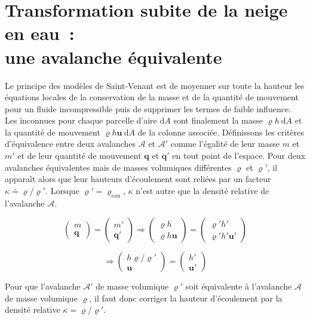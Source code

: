 \section{Transformation subite de la neige en eau~:\\une avalanche équivalente}

Le principe des modèles de Saint-Venant est de moyenner sur toute la hauteur les équations locales de la conservation de la masse et de la quantité de mouvement pour un fluide incompressible puis de supprimer les termes de faible influence. Les inconnues pour chaque parcelle d'aire $\mathrm dA$ sont finalement la masse $\varrho h~\mathrm dA$ et la quantité de mouvement $\varrho h\bm u~\mathrm dA$ de la colonne associée. Définissons les critères d'équivalence entre deux avalanches $\mathcal A$ et $\mathcal A'$ comme l'égalité de leur masse $m$ et $m'$ et de leur quantité de mouvement $\bm q$ et $\bm q'$ en tout point de l'espace. Pour deux avalanches équivalentes mais de masses volumiques différentes $\varrho$ et $\varrho'$, il apparaît alors que leur hauteurs d'écoulement sont reliées par un facteur $\kappa\doteq\varrho/\varrho'$. Lorsque $\varrho'=\varrho_\text{eau}$, $\kappa$ n'est autre que la densité relative de l'avalanche $\mathcal A$. 

$$\begin{pmatrix}m\\\bm q\end{pmatrix} =\begin{pmatrix}m'\\\bm q'\end{pmatrix}\Rightarrow\begin{pmatrix}\varrho h\\\varrho h \bm u\end{pmatrix} = \begin{pmatrix}\varrho' h'\\\varrho' h' \bm u'\end{pmatrix}$$

\begin{equation}\label{eq:equiv}
    \Rightarrow \begin{pmatrix}h\varrho/\varrho' \\\bm u\end{pmatrix} = \begin{pmatrix}h'\\\bm u'\end{pmatrix}
\end{equation}

Pour que l'avalanche $\mathcal A'$ de masse volumique $\varrho'$ soit équivalente à l'avalanche $\mathcal A$ de masse volumique $\varrho$, il faut donc corriger la hauteur d'écoulement par la densité relative $\kappa=\varrho/\varrho'$.

